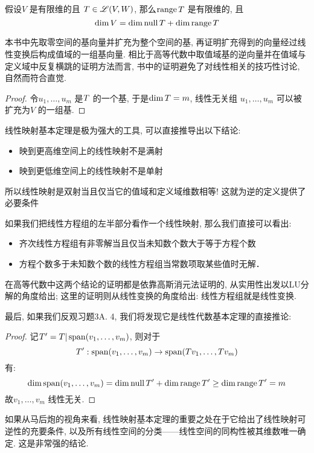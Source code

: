 \begin{theorem}
    假设\(V\) 是有限维的且 \(T \in \mathscr{L}(V,W)\), 那么\(\operatorname{range}
    T\) 是有限维的, 且\[
        \dim V = \dim \operatorname{null} T + \dim \operatorname{range} T
    \]
\end{theorem}
本书中先取零空间的基向量并扩充为整个空间的基, 再证明扩充得到的向量经过线性变换后构成值域的一组基向量.
相比于高等代数中取值域基的逆向量并在值域与定义域中反复横跳的证明方法而言,
书中的证明避免了对线性相关的技巧性讨论, 自然而符合直觉.

\begin{proof}
    令\(u_1, \dots , u_{m}\) 是\(\null T\) 的一个基, 于是\(\dim
    \null T = m\), 线性无关组 \(u_{1}, \dots ,u_{m}\) 可以被扩充为\(V\) 的一组基.
\end{proof}

线性映射基本定理是极为强大的工具, 可以直接推导出以下结论:

\begin{itemize}
    \item 映到更高维空间上的线性映射不是满射
    \item 映到更低维空间上的线性映射不是单射
\end{itemize}
所以线性映射是双射当且仅当它的值域和定义域维数相等! 这就为逆的定义提供了必要条件

如果我们把线性方程组的左半部分看作一个线性映射, 那么我们直接可以看出:
\begin{itemize}
    \item 齐次线性方程组有非零解当且仅当未知数个数大于等于方程个数
    \item 方程个数多于未知数个数的线性方程组当常数项取某些值时无解．
\end{itemize}

在高等代数中这两个结论的证明都是依靠高斯消元法证明的, 从实用性出发以LU分解的角度给出;
这里的证明则从线性变换的角度给出: 线性方程组就是线性变换.

最后, 如果我们反观习题3A. 4, 我们将发现它是线性代数基本定理的直接推论:
\begin{proof}
    记\(T'= T|\operatorname{span}(v_{1}, \dots, v_{m})\),
    则对于\[T': \operatorname{span}(v_{1}, \dots, v_{m}) \to
    \operatorname{span}(Tv_{1}, \dots, Tv_{m})\]
    有:
    \[
        \dim \operatorname{span}(v_{1}, \dots, v_{m}) = \dim
        \operatorname{null} T' +
        \dim \operatorname{range} T' \geq \dim \operatorname{range} T' = m
    \]
    故\(v_{1}, \dots, v_{m}\) 线性无关.
\end{proof}

如果从马后炮的视角来看,
线性映射基本定理的重要之处在于它给出了线性映射可逆性的充要条件,
以及所有线性空间的分类——线性空间的同构性被其维数唯一确定. 这是非常强的结论.

